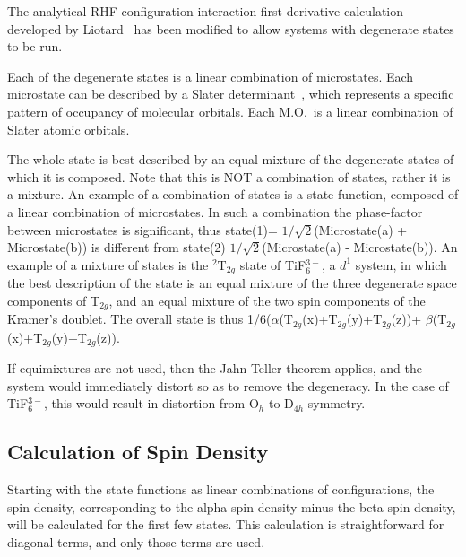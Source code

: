 The analytical RHF configuration interaction first derivative calculation
developed by Liotard~\cite{analci} has been modified to allow systems with
degenerate states to be run.

Each of the degenerate states is a linear combination of microstates. Each
microstate can be described by a Slater
determinant~\cite{slater_det1,slater_det2}, which represents a specific pattern
of occupancy of molecular orbitals. Each M.O.\ is a linear combination of
Slater atomic orbitals.

 The whole state is best described by an equal
mixture of the degenerate states of which it is composed.  Note that this is
NOT a combination of states, rather it is a mixture.  An example of a
combination of  states is a state function, composed of a linear combination of
microstates.  In such a combination the phase-factor between microstates is
significant, thus state(1)= $1/\sqrt{2}$(Microstate(a) + Microstate(b)) is
different from state(2) $1/\sqrt{2}$(Microstate(a) - Microstate(b)).  An
example of a mixture of states is the $^2$T$_{2g}$ state of TiF$_6^{3-}$, a
$d^1$ system, in which the best description of the state is an equal mixture of
the three degenerate space components of T$_{2g}$, and an equal mixture of the
two spin components of the Kramer's doublet.  The overall state is thus
1/6($\alpha$(T$_{2g}$(x)+T$_{2g}$(y)+T$_{2g}$(z))+
$\beta$(T$_{2g}$(x)+T$_{2g}$(y)+T$_{2g}$(z)).

If equimixtures are not used, then the Jahn-Teller theorem applies, and the
system would immediately distort so as to remove the degeneracy.  In the case
of TiF$_6^{3-}$, this would result in distortion from O$_h$ to D$_{4h}$
symmetry.


\subsection{Calculation of  Spin Density}
Starting  with  the  state  functions  as  linear  combinations  of
configurations,  the    spin density, corresponding to the alpha spin density
minus the beta spin density, will  be  calculated  for  the first  few
states.   This  calculation  is straightforward for diagonal terms, and only
those terms are used. 
